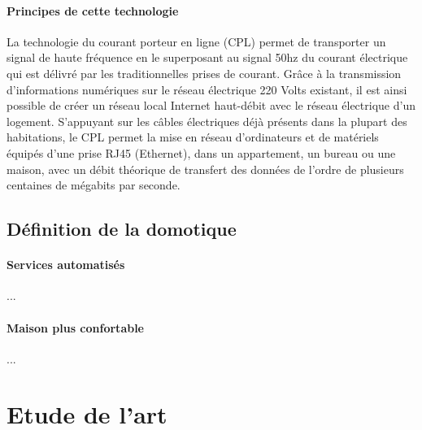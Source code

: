             \paragraph{Principes de cette technologie}
La technologie du courant porteur en ligne (CPL) permet de transporter un signal de haute fréquence en le superposant au signal 50hz du courant électrique qui est délivré par les traditionnelles prises de courant.
Grâce à la transmission d'informations numériques sur le réseau électrique 220 Volts existant, il est ainsi possible de créer un réseau local Internet haut-débit avec le réseau électrique d'un logement.
S'appuyant sur les câbles électriques déjà présents dans la plupart des habitations, le CPL permet la mise en réseau d'ordinateurs et de matériels équipés d'une prise RJ45 (Ethernet), dans un appartement, un bureau ou une maison, avec un débit théorique de transfert des données de l'ordre de plusieurs centaines de mégabits par seconde.
        \subsection{Définition de la domotique}
            \paragraph{Services automatisés}
                ...
            \paragraph{Maison plus confortable}
                ...
    \section{Etude de l’art}
